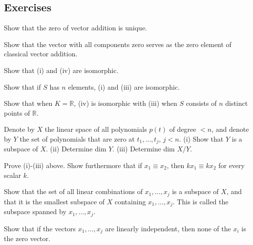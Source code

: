 \subsection{Exercises} 

  \begin{exercise}[Lax 1.1] 
    Show that the zero of vector addition is unique.
  \end{exercise}

  \begin{exercise}[Lax 1.2] 
    Show that the vector with all components zero serves as the zero element of classical vector addition.
  \end{exercise}

  \begin{exercise}[Lax 1.3] 
    Show that (i) and (iv) are isomorphic.
  \end{exercise}

  \begin{exercise}[Lax 1.4] 
    Show that if $S$ has $n$ elements, (i) and (iii) are isomorphic.
  \end{exercise}

  \begin{exercise}[Lax 1.5] 
    Show that when $K = \mathbb{R}$, (iv) is isomorphic with (iii) when $S$ consists of $n$ distinct points of $\mathbb{R}$.
  \end{exercise}

  \begin{exercise}[Lax 1.6] 
    Denote by $X$ the linear space of all polynomials $p(t)$ of degree $< n$, and denote by $Y$ the set of polynomials that are zero at $t_1,\ldots,t_j$, $j < n$.
    (i) Show that $Y$ is a subspace of $X$.
    (ii) Determine dim $Y$.
    (iii) Determine dim $X/Y$.
  \end{exercise}

  \begin{exercise}[Lax 1.7] 
    Prove (i)-(iii) above. Show furthermore that if $x_1 \equiv x_2$, then $kx_1 \equiv kx_2$ for every scalar $k$.
  \end{exercise}

  \begin{exercise}[Lax 1.9] 
    Show that the set of all linear combinations of $x_1,\ldots,x_j$ is a subspace of $X$, and that it is the smallest subspace of $X$ containing $x_1,\ldots,x_j$. This is called the subspace spanned by $x_1,\ldots,x_j$.
  \end{exercise}

  \begin{exercise}[Lax 1.10] 
    Show that if the vectors $x_1,\ldots,x_j$ are linearly independent, then none of the $x_i$ is the zero vector.
  \end{exercise}


